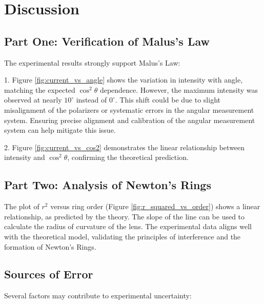 \documentclass[journal]{IEEEtran}
\begin{document}
\section{Discussion}

\subsection{Part One: Verification of Malus's Law}
The experimental results strongly support Malus's Law:

1. Figure \ref{fig:current_vs_angle} shows the variation in intensity with angle, matching the expected $\cos^2\theta$ dependence. However, the maximum intensity was observed at nearly $10^\circ$ instead of $0^\circ$. This shift could be due to slight misalignment of the polarizers or systematic errors in the angular measurement system. Ensuring precise alignment and calibration of the angular measurement system can help mitigate this issue.

2. Figure \ref{fig:current_vs_cos2} demonstrates the linear relationship between intensity and $\cos^2\theta$, confirming the theoretical prediction.

\subsection{Part Two: Analysis of Newton's Rings}
The plot of $r^2$ versus ring order (Figure \ref{fig:r_squared_vs_order}) shows a linear relationship, as predicted by the theory. The slope of the line can be used to calculate the radius of curvature of the lens. The experimental data aligns well with the theoretical model, validating the principles of interference and the formation of Newton's Rings.

\subsection{Sources of Error}
Several factors may contribute to experimental uncertainty:
\end{document}
